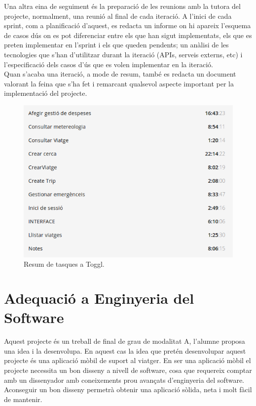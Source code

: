 Una altra eina de seguiment és la preparació de les reunions amb la tutora del projecte, normalment, una reunió al final de cada iteració. A l’inici de cada sprint, com a planificació d’aquest, es redacta un informe on hi apareix l’esquema de casos dús on es pot diferenciar entre els que han sigut implementats, els que es preten implementar en l’sprint i els que queden pendents; un anàlisi de les tecnologies que s’han d’utilitzar durant la iteració (APIs, serveis externs, etc) i l’especificació dels
casos d’ús que es volen implementar en la iteració.\\

Quan s’acaba una iteració, a mode de resum, també es redacta un document
valorant la feina que s’ha fet i remarcant qualsevol aspecte important per la implementació del projecte.

\begin{figure}[!h]
\centering
\includegraphics[scale=0.65]{Figures/toggl.jpg}
\caption{Resum de tasques a Toggl.}
\end{figure}

\section{Adequació a Enginyeria del Software}

Aquest projecte és un treball de final de grau de modalitat A, l’alumne proposa una idea i la desenvolupa. En aquest cas la idea que pretén desenvolupar aquest projecte és una aplicació mòbil de suport al viatger. En ser una aplicació mòbil el projecte necessita un bon disseny a nivell de software, cosa que requereix comptar amb un dissenyador amb coneixements prou avançats d’enginyeria del software. Aconseguir un bon disseny permetrà obtenir una aplicació sòlida, neta i molt fàcil de
mantenir.\\

